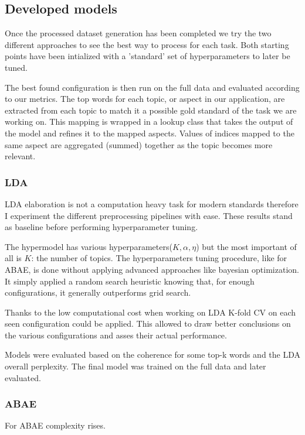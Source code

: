 \subsection{Developed models}
Once the processed dataset generation has been completed we try the two different approaches to see the best way
to process for each task. Both starting points have been intialized with a 'standard' set of hyperparameters
to later be tuned.

The best found configuration is then run on the full data and evaluated according to our metrics.
The top words for each topic, or aspect in our application, are extracted from each topic to match it a possible
gold standard of the task we are working on.
This mapping is wrapped in a lookup class that takes the output of the model and refines it to the mapped aspects.
Values of indices mapped to the same aspect are aggregated (summed) together as the topic becomes more relevant.

\subsubsection{LDA}
LDA elaboration is not a computation heavy task for modern standards therefore I experiment the different
preprocessing pipelines with ease.
These results stand as baseline before performing hyperparameter tuning.

The hypermodel has various hyperparameters($K,\alpha, \eta$) but the most important of all is $K$: the number of topics.
The hyperparameters tuning procedure, like for ABAE, is done without applying advanced approaches like bayesian optimization.
It simply applied a random search heuristic knowing that, for enough configurations, it generally outperforms grid search.

Thanks to the low computational cost when working on LDA K-fold CV on each seen configuration could be applied.
This allowed to draw better conclusions on the various configurations and asses their actual performance.

Models were evaluated based on the coherence for some top-k words and the LDA overall perplexity.
The final model was trained on the full data and later evaluated.

\subsubsection{ABAE}
For ABAE complexity rises.

